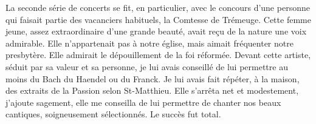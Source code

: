 La seconde série de concerts se fit, en particulier, avec le concours d’une personne
qui faisait partie des vacanciers habituels, la Comtesse de Trémeuge. Cette femme
jeune, assez extraordinaire d’une grande beauté, avait reçu de la nature une voix
admirable. Elle n’appartenait pas à notre église, mais aimait fréquenter notre
presbytère. Elle admirait le dépouillement de la foi réformée. Devant cette artiste,
séduit par sa valeur et sa personne, je lui avais conseillé de lui permettre au moins du Bach du
Haendel ou du Franck. Je lui avais fait répéter, à la maison, des extraits de la Passion
selon St-Matthieu. Elle s’arrêta net et modestement, j’ajoute sagement, elle me
conseilla de lui permettre de chanter nos beaux cantiques, soigneusement
sélectionnés. Le succès fut total.
